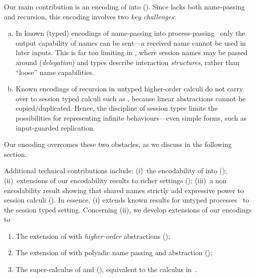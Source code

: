 \documentclass[runningheads]{llncs}
\begin{document}
Our main contribution is 
an encoding of \HOp into \HO ().  
Since \HO lacks 
both name-passing and recursion, this encoding involves two \emph{key challenges}:
\begin{enumerate}[a.]
\item In known (typed) 
encodings of name-passing into process-passing~\cite{SaWabook} %
only the output capability of names can be sent---a received name cannot be used in later inputs.
This is far too limiting in \HOp, where 
 session names %
 may be passed around (\emph{delegation})
and types describe interaction  \emph{structures}, rather than ``loose'' name capabilities. %



\item %
Known encodings of recursion in untyped higher-order calculi
do not carry over to session typed calculi such as \HOp,
because linear abstractions cannot be copied/duplicated. Hence, the discipline of session types  limits 
the possibilities for representing infinite behaviours---even simple forms, such as input-guarded replication.
\end{enumerate}





\noi
Our encoding overcomes these two obstacles, as we discuss in the following section.

Additional technical contributions include: 
(i)~the encodability of \HO into \sessp (); 
(ii)~extensions of our encodability results to richer settings ();
(iii)~a non encodability result showing that shared names strictly add expressive power to session calculi ().
In essence, (i) extends known  results for untyped processes~\cite{SangiorgiD:expmpa} to the session typed setting.
Concerning (ii), we develop extensions of our encodings to 
\begin{enumerate}[-]
\item The extension of \HOp with \emph{higher-order} abstractions (\HOpp); 
\item The extension of \HOp with polyadic name passing and abstraction (\PHOp); 
\item The super-calculus of \HOpp and \PHOp (\PHOpp), equivalent to the calculus in~\cite{tlca07}.
\end{enumerate}
\end{document}

